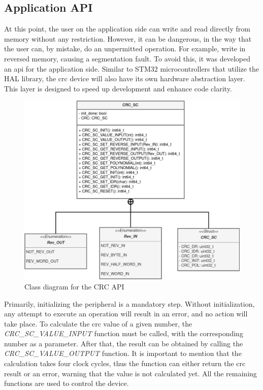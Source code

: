 \subsection{Application API}

At this point, the user on the application side can write and read directly from memory without any restriction. However, it can be
dangerous, in the way that the user can, by mistake, do an unpermitted operation. For example, write in reversed memory, causing a
segmentation fault. To avoid this, it was developed an \gls{api} for the application side. Similar to STM32 microcontrollers that 
utilize the HAL library, the \gls{crc} device will also have its own hardware abstraction layer. This layer is designed to speed up 
development and enhance code clarity.

\begin{figure}[H]
	\centering
 	\includegraphics[width=0.7\linewidth]{Images/CRC_API_Class_Diagram.png} 
 	\caption{Class diagram for the CRC API}
\end{figure}

Primarily, initializing the peripheral is a mandatory step. Without initialization, any attempt to execute an operation will 
result in an error, and no action will take place. To calculate the \gls{crc} value of a given number, the \textit{CRC\_SC\_VALUE\_INPUT} 
function must be called, with the corresponding number as a parameter. After that, the result can be obtained by calling the 
\textit{CRC\_SC\_VALUE\_OUTPUT} function. It is important to mention that the calculation takes four clock cycles, thus the function can 
either return the \gls{crc} result or an error, warning that the value is not calculated yet. All the remaining functions are used to
control the device.

